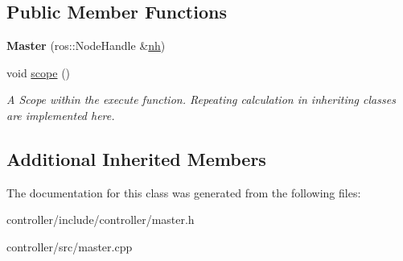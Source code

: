 \subsection*{Public Member Functions}
\begin{DoxyCompactItemize}
\item 
{\bfseries Master} (ros\+::\+Node\+Handle \&\hyperlink{classController_a24e3d3c2536f6ed29018bad1fd53dae2}{nh})\hypertarget{classMaster_ab52840de45f9ce7022c9cf58cfb49398}{}\label{classMaster_ab52840de45f9ce7022c9cf58cfb49398}

\item 
void \hyperlink{classMaster_a159c65ac1a0c005bbcd1868b972935ce}{scope} ()\hypertarget{classMaster_a159c65ac1a0c005bbcd1868b972935ce}{}\label{classMaster_a159c65ac1a0c005bbcd1868b972935ce}

\begin{DoxyCompactList}\small\item\em A Scope within the execute function. Repeating calculation in inheriting classes are implemented here. \end{DoxyCompactList}\end{DoxyCompactItemize}
\subsection*{Additional Inherited Members}


The documentation for this class was generated from the following files\+:\begin{DoxyCompactItemize}
\item 
controller/include/controller/master.\+h\item 
controller/src/master.\+cpp\end{DoxyCompactItemize}
